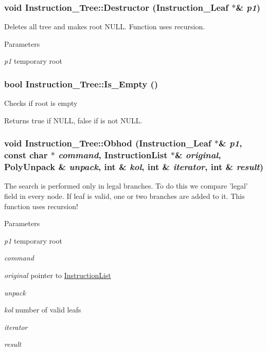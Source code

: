 \hypertarget{classInstruction__Tree_a3ede055013058a1f9abefb5f50c02423}{
\subsubsection[{Destructor}]{\setlength{\rightskip}{0pt plus 5cm}void Instruction\_\-Tree::Destructor ({\bf Instruction\_\-Leaf} $\ast$\& {\em p1})}}
\label{classInstruction__Tree_a3ede055013058a1f9abefb5f50c02423}
Deletes all tree and makes root NULL. Function uses recursion. 
\begin{DoxyParams}{Parameters}
\item[{\em p1}]temporary root \end{DoxyParams}
\hypertarget{classInstruction__Tree_accb3231bdc3392cc49a8f6b6c79c82a1}{
\subsubsection[{Is\_\-Empty}]{\setlength{\rightskip}{0pt plus 5cm}bool Instruction\_\-Tree::Is\_\-Empty ()}}
\label{classInstruction__Tree_accb3231bdc3392cc49a8f6b6c79c82a1}
Checks if root is empty \begin{DoxyReturn}{Returns}
true if NULL, false if is not NULL. 
\end{DoxyReturn}
\hypertarget{classInstruction__Tree_afc8fc8d76c6ab64eedf78c551972f2df}{
\subsubsection[{Obhod}]{\setlength{\rightskip}{0pt plus 5cm}void Instruction\_\-Tree::Obhod ({\bf Instruction\_\-Leaf} $\ast$\& {\em p1}, \/  const char $\ast$ {\em command}, \/  {\bf InstructionList} $\ast$\& {\em original}, \/  {\bf PolyUnpack} \& {\em unpack}, \/  int \& {\em kol}, \/  int \& {\em iterator}, \/  int \& {\em result})}}
\label{classInstruction__Tree_afc8fc8d76c6ab64eedf78c551972f2df}
The search is performed only in legal branches. To do this we compare 'legal' field in every node. If leaf is valid, one or two branches are added to it. This function uses recursion! 
\begin{DoxyParams}{Parameters}
\item[{\em p1}]temporary root \item[{\em command}]\item[{\em original}]pointer to \hyperlink{structInstructionList}{InstructionList} \item[{\em unpack}]\item[{\em kol}]number of valid leafs \item[{\em iterator}]\item[{\em result}]\end{DoxyParams}
